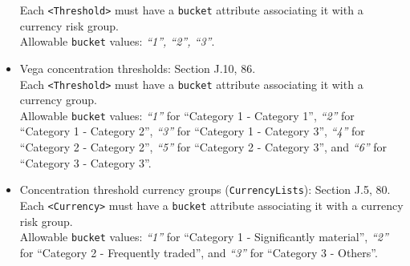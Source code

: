 \begin{itemize}
    Each {\tt <Threshold>} must have a {\tt bucket} attribute associating it with a currency risk group. \\
    Allowable {\tt bucket} values: \emph{``1'', ``2'', ``3''}.
  \item Vega concentration thresholds: Section J.10, 86. \\
    Each {\tt <Threshold>} must have a {\tt bucket} attribute associating it with a currency group. \\
    Allowable {\tt bucket} values: \emph{``1''} for ``Category 1 - Category 1'', \emph{``2''} for ``Category 1 - Category 2'', \emph{``3''} for ``Category 1 - Category 3'', \emph{``4''} for ``Category 2 - Category 2'', \emph{``5''} for ``Category 2 - Category 3'', and \emph{``6''} for ``Category 3 - Category 3''.
  \item Concentration threshold currency groups ({\tt CurrencyLists}): Section J.5, 80. \\
    Each {\tt <Currency>} must have a {\tt bucket} attribute associating it with a currency risk group. \\
    Allowable {\tt bucket} values: \emph{``1''} for ``Category 1 - Significantly material'', \emph{``2''} for ``Category 2 - Frequently traded'', and \emph{``3''} for ``Category 3 - Others''.
\end{itemize}

